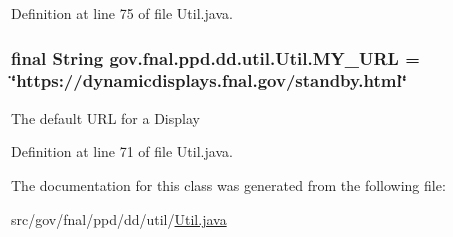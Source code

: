 Definition at line 75 of file Util.\-java.

\hypertarget{classgov_1_1fnal_1_1ppd_1_1dd_1_1util_1_1Util_a88e9a358bc6bc125fea7a6a32cd6a2b2}{
\subsubsection[{M\-Y\-\_\-\-U\-R\-L}]{\setlength{\rightskip}{0pt plus 5cm}final String gov.\-fnal.\-ppd.\-dd.\-util.\-Util.\-M\-Y\-\_\-\-U\-R\-L = \char`\"{}https\-://dynamicdisplays.\-fnal.\-gov/standby.\-html\char`\"{}\hspace{0.3cm}{\ttfamily [static]}}}\label{classgov_1_1fnal_1_1ppd_1_1dd_1_1util_1_1Util_a88e9a358bc6bc125fea7a6a32cd6a2b2}
The default U\-R\-L for a Display 

Definition at line 71 of file Util.\-java.



The documentation for this class was generated from the following file\-:\begin{DoxyCompactItemize}
\item 
src/gov/fnal/ppd/dd/util/\hyperlink{Util_8java}{Util.\-java}\end{DoxyCompactItemize}
